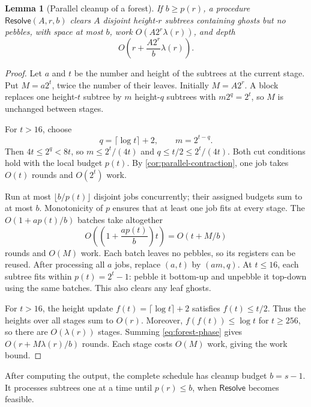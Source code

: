\documentclass[11pt]{article}
\newtheorem{lemma}[lemma]{Lemma}
\theoremstyle{definition}
\theoremstyle{remark}
\newcommand{\Resolve}{\mathsf{Resolve}}
\begin{document}
\begin{lemma}[Parallel cleanup of a forest]
\label{lem:resolver}
If $b\ge p(r)$, a procedure $\Resolve(A,r,b)$ clears $A$ disjoint height-$r$ subtrees containing ghosts but no pebbles, with space at most $b$, work $O(A2^r\lambda(r))$, and depth
\begin{equation}
O\!\left(r+\frac{A2^r}{b}\lambda(r)\right).
\label{eq:forest-cleanup}
\end{equation}
\end{lemma}
\begin{proof}
Let $a$ and $t$ be the number and height of the subtrees at the current stage. Put $M=a2^t$, twice the number of their leaves. Initially $M=A2^r$. A block replaces one height-$t$ subtree by $m$ height-$q$ subtrees with $m2^q=2^t$, so $M$ is unchanged between stages.

For $t>16$, choose
\begin{equation}
q=\lceil\log t\rceil+2, \qquad m=2^{t-q}.
\label{eq:resolver-cut}
\end{equation}
Then $4t\le2^q<8t$, so $m\le2^t/(4t)$ and $q\le t/2\le2^t/(4t)$. Both cut conditions hold with the local budget $p(t)$. By \cref{cor:parallel-contraction}, one job takes $O(t)$ rounds and $O(2^t)$ work.

Run at most $\lfloor b/p(t)\rfloor$ disjoint jobs concurrently; their assigned budgets sum to at most $b$. Monotonicity of $p$ ensures that at least one job fits at every stage. The $O(1+ap(t)/b)$ batches take altogether
\begin{equation}
O\!\left(\left(1+\frac{ap(t)}b\right)t\right)=O(t+M/b)
\label{eq:forest-phase}
\end{equation}
rounds and $O(M)$ work. Each batch leaves no pebbles, so its registers can be reused. After processing all $a$ jobs, replace $(a,t)$ by $(am,q)$. At $t\le16$, each subtree fits within $p(t)=2^t-1$: pebble it bottom-up and unpebble it top-down using the same batches. This also clears any leaf ghosts.

For $t>16$, the height update $f(t)=\lceil\log t\rceil+2$ satisfies $f(t)\le t/2$. Thus the heights over all stages sum to $O(r)$. Moreover, $f(f(t))\le\log t$ for $t\ge256$, so there are $O(\lambda(r))$ stages. Summing \cref{eq:forest-phase} gives $O(r+M\lambda(r)/b)$ rounds. Each stage costs $O(M)$ work, giving the work bound.
\end{proof}

After computing the output, the complete schedule has cleanup budget $b=s-1$. It processes subtrees one at a time until $p(r)\le b$, when $\Resolve$ becomes feasible.
\end{document}
